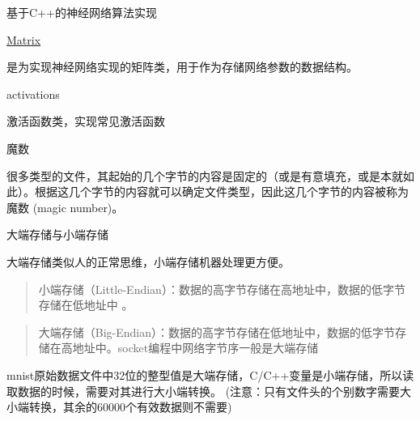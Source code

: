 基于\+C++的神经网络算法实现


\begin{DoxyItemize}
\item \mbox{\hyperlink{class_matrix}{Matrix}}

\quad{}\quad{}是为实现神经网络实现的矩阵类，用于作为存储网络参数的数据结构。
\item activations

\quad{}\quad{}激活函数类，实现常见激活函数
\item 魔数

\quad{}\quad{}很多类型的文件，其起始的几个字节的内容是固定的（或是有意填充，或是本就如此）。根据这几个字节的内容就可以确定文件类型，因此这几个字节的内容被称为魔数 (magic number)。
\item 大端存储与小端存储

\quad{}\quad{}大端存储类似人的正常思维，小端存储机器处理更方便。 \begin{quote}
小端存储（\+Little-\/\+Endian）：数据的高字节存储在高地址中，数据的低字节存储在低地址中 。 \end{quote}
\begin{quote}
大端存储（\+Big-\/\+Endian）：数据的高字节存储在低地址中，数据的低字节存储在高地址中。socket编程中网络字节序一般是大端存储 \end{quote}

\begin{DoxyCode}{0}

\end{DoxyCode}
 \quad{}\quad{}mnist原始数据文件中32位的整型值是大端存储，\+C/\+C++变量是小端存储，所以读取数据的时候，需要对其进行大小端转换。 (注意：只有文件头的个别数字需要大小端转换，其余的60000个有效数据则不需要) 
\end{DoxyItemize}